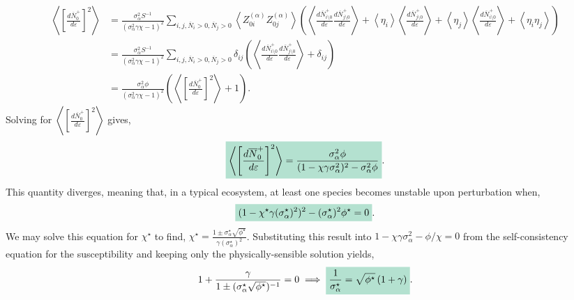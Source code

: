 \documentclass[10pt]{article}
\newcommand{\mathcolorbox}[1]{\colorbox{hlcol}{$\displaystyle #1$}}
\newcommand{\eval}[1]{\left\langle #1 \right\rangle}
\begin{document}
\begin{align}
	\eval{\left[
		\frac{d\overline N_0^+}{d\varepsilon}
	\right]^2}
	&=
	\frac{\sigma_\alpha^2 S^{-1}}{\left(\sigma_\alpha^2 \gamma \chi - 1\right)^2}
	\sum_{i,j,\overline N_i>0,\overline N_j>0} 
	\eval{
		Z_{0i}^{(\alpha)}
		Z_{0j}^{(\alpha)}
	}
	\left(
		\eval{\frac{d\overline N_{i\setminus 0}^+}{d\varepsilon}
		\frac{d\overline N_{j\setminus 0}^+}{d\varepsilon}}
		+
		\eval{\eta_i}
		\eval{\frac{d\overline N_{j\setminus 0}^+}{d\varepsilon}}
		+
		\eval{\eta_j}
		\eval{\frac{d\overline N_{i\setminus 0}^+}{d\varepsilon}}
		+
		\eval{\eta_i
		\eta_j}
	\right)
	\nonumber
	\\
	&=
	\frac{\sigma_\alpha^2 S^{-1}}{\left(\sigma_\alpha^2 \gamma \chi - 1\right)^2}
	\sum_{i,j,\overline N_i>0,\overline N_j>0} 
		\delta_{ij}
	\left(
		\eval{\frac{d\overline N_{i\setminus 0}^+}{d\varepsilon}
		\frac{d\overline N_{j\setminus 0}^+}{d\varepsilon}}
		+
		\delta_{ij}
	\right)
	\nonumber
	\\
	&=
	\frac{\sigma_\alpha^2 \phi}{\left(\sigma_\alpha^2 \gamma \chi - 1\right)^2}
	\left(
		\eval{\left[
		\frac{d\overline N_0^+}{d\varepsilon}
	\right]^2}
	+
	1
	\right).
\end{align}
Solving for $\eval{\left[
	\frac{d\overline N_0^+}{d\varepsilon}
\right]^2}$ gives,
\begin{align}
	\mathcolorbox{
	\eval{\left[
		\frac{d\overline N_0^+}{d\varepsilon}
	\right]^2}
	=
	\frac{\sigma_\alpha^2 \phi}{(1-\chi \gamma \sigma_\alpha^2)^2 - \sigma_\alpha^2 \phi}}.
\end{align}
This quantity diverges, meaning that, in a typical ecosystem, at least one species becomes unstable upon perturbation when,
\begin{align}
	\mathcolorbox{(1-\chi^\star\gamma(\sigma_\alpha^\star)^2)^2 - (\sigma_\alpha^\star)^2 \phi^\star=0}.
\end{align}
We may solve this equation for $\chi^\star$ to find, $\chi^\star = \frac{1\pm \sigma_\alpha^\star\sqrt{\phi^\star}}{\gamma(\sigma_\alpha^\star)^2}$.
Substituting this result into $1-\chi\gamma\sigma_\alpha^2 - \phi/\chi = 0$ from the self-consistency equation for the susceptibility and keeping only the physically-sensible solution yields,
\begin{align}
	1 + \frac{\gamma}{1 \pm (\sigma_\alpha^\star \sqrt{\phi^\star})^{-1}}
	=
	0
	\implies
	\mathcolorbox{
	\frac{1}{\sigma_\alpha^\star}
	=
	\sqrt{\phi^\star}
	\left(
		1+\gamma
	\right)}.
\end{align}
\end{document}
